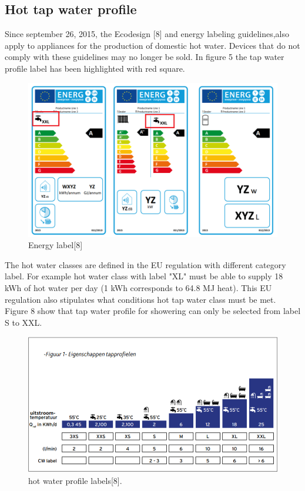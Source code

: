 \documentclass[a4paper,10pt]{article}
\begin{document}


\begin{appendices}
  \section{Hot tap water profile}

Since september 26, 2015, the Ecodesign [8] and energy labeling guidelines,also apply to appliances for the production of domestic hot water. Devices that do not comply with these guidelines may no longer be sold. In figure 5 the tap water profile label has been highlighted with red square.\\
 

 \begin{figure}[H]
\centering
\includegraphics[width=1\columnwidth]{pictures/energy label.png}
\caption[Short title]{Energy label[8]}
\label{fig:ff7}\end{figure}
The hot water classes are defined in the EU regulation with different category label. For example hot water class with label "XL" must be able to supply 18 kWh of hot water per day (1 kWh corresponds to 64.8 MJ heat). This EU regulation also stipulates what conditions hot tap water class must be met.
Figure 8 show that tap water profile for showering can only be selected from label S to XXL.

 \begin{figure}[ht]
\centering
\includegraphics[width=1\columnwidth]{pictures/tap profile.png}
\caption[Short title]{hot water profile labels[8].}
\label{fig:ff8}\end{figure}


\end{appendices}
\end{document}
